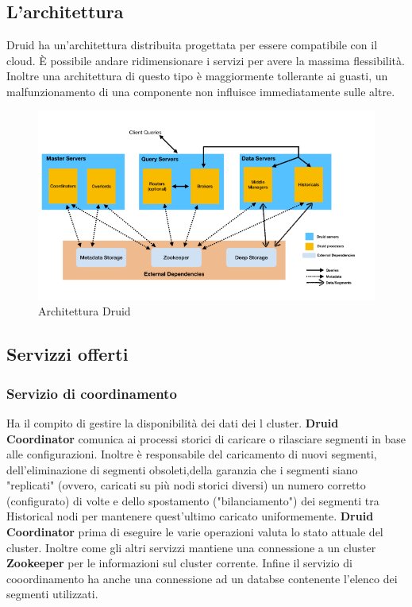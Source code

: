 \documentclass{article}
\begin{document}
\subsection{L'architettura}
Druid ha un'architettura distribuita progettata per essere compatibile con il cloud. È possibile andare ridimensionare i servizi per avere la massima flessibilità. Inoltre una architettura di questo tipo è maggiormente tollerante ai guasti, un malfunzionamento di una componente non influisce immediatamente sulle altre.
\begin{figure}[h]
    \centering
    \includegraphics[scale=0.5]{images/architettura_druid.png}
    \caption{Architettura Druid}
    \label{fig:my_label}
\end{figure}
\subsection{Servizzi offerti}
\subsubsection{Servizio di coordinamento}
Ha il compito di gestire la disponibilità dei dati dei l cluster.
\textbf{Druid Coordinator} comunica ai processi storici di caricare o rilasciare segmenti in base alle configurazioni.
Inoltre è responsabile del caricamento di nuovi segmenti, dell'eliminazione di segmenti obsoleti,della garanzia che i segmenti siano "replicati" (ovvero, caricati su più nodi storici diversi) un numero corretto (configurato) di volte e dello spostamento ("bilanciamento") dei segmenti tra Historical nodi per mantenere quest'ultimo caricato uniformemente.
\textbf{Druid Coordinator} prima di eseguire le varie operazioni valuta lo stato attuale del cluster. Inoltre come gli altri servizzi mantiene una connessione a un cluster \textbf{Zookeeper} per le informazioni sul cluster corrente. Infine il servizio di cooordinamento ha anche una connessione ad un databse contenente l'elenco dei segmenti utilizzati.
\end{document}
